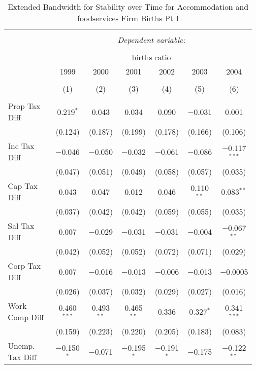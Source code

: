 
\begin{table}[!htbp] \centering 
  \caption{Extended Bandwidth for Stability over Time for  Accommodation and foodservices Firm Births Pt I} 
  \label{72year_eb} 
\small 
\begin{tabular}{@{\extracolsep{5pt}}lcccccc} 
\\[-1.8ex]\hline 
\hline \\[-1.8ex] 
 & \multicolumn{6}{c}{\textit{Dependent variable:}} \\ 
\cline{2-7} 
\\[-1.8ex] & \multicolumn{6}{c}{births ratio} \\ 
 & 1999 & 2000 & 2001 & 2002 & 2003 & 2004 \\ 
\\[-1.8ex] & (1) & (2) & (3) & (4) & (5) & (6)\\ 
\hline \\[-1.8ex] 
 Prop Tax Diff & 0.219$^{*}$ & 0.043 & 0.034 & 0.090 & $-$0.031 & 0.001 \\ 
  & (0.124) & (0.187) & (0.199) & (0.178) & (0.166) & (0.106) \\ 
  Inc Tax Diff & $-$0.046 & $-$0.050 & $-$0.032 & $-$0.061 & $-$0.086 & $-$0.117$^{***}$ \\ 
  & (0.047) & (0.051) & (0.049) & (0.058) & (0.057) & (0.035) \\ 
  Cap Tax Diff & 0.043 & 0.047 & 0.012 & 0.046 & 0.110$^{**}$ & 0.083$^{**}$ \\ 
  & (0.037) & (0.042) & (0.042) & (0.059) & (0.055) & (0.035) \\ 
  Sal Tax Diff & 0.007 & $-$0.029 & $-$0.031 & $-$0.031 & $-$0.004 & $-$0.067$^{**}$ \\ 
  & (0.042) & (0.052) & (0.052) & (0.072) & (0.071) & (0.029) \\ 
  Corp Tax Diff & 0.007 & $-$0.016 & $-$0.013 & $-$0.006 & $-$0.013 & $-$0.0005 \\ 
  & (0.026) & (0.037) & (0.032) & (0.029) & (0.027) & (0.016) \\ 
  Work Comp Diff & 0.460$^{***}$ & 0.493$^{**}$ & 0.465$^{**}$ & 0.336 & 0.327$^{*}$ & 0.341$^{***}$ \\ 
  & (0.159) & (0.223) & (0.220) & (0.205) & (0.183) & (0.083) \\ 
  Unemp. Tax Diff & $-$0.150$^{*}$ & $-$0.071 & $-$0.195$^{*}$ & $-$0.191$^{*}$ & $-$0.175 & $-$0.122$^{**}$ \\ 

\end{tabular}
\end{table}
